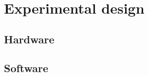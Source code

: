 \graphicspath{{exp_design/fig/}}

\chapter{Experimental design}
\label{chap:exp_design}

    \section{Hardware}
    \section{Software}


